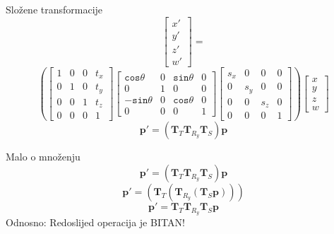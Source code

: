 \documentclass[9pt]{beamer}
\begin{document}
\begin{frame}{Složene transformacije}
	\[ \left[ \begin{array}{c}
	x' \\ y' \\ z'\\ w'
	\end{array}   \right]   = \]  
	\[ \left( \left[ \begin{array}{cccc}
	1 & 0 & 0 & t_{x} \\
	0 & 1 & 0 & t_{y} \\
	0 & 0 & 1 & t_{z} \\
	0 & 0 & 0 & 1 
	\end{array} \right] 
	\left[ \begin{array}{cccc}
	\mathtt{cos}\theta & 0 & \mathtt{sin}\theta & 0 \\
	0 & 1 & 0 & 0 \\
	-\mathtt{sin}\theta & 0 & \mathtt{cos}\theta & 0 \\
	0 & 0 & 0 & 1 
	\end{array} \right] 
	\left[ \begin{array}{cccc}
	s_{x} & 0 & 0 & 0 \\
	0 & s_{y} & 0 & 0 \\
	0 & 0 & s_{z} & 0 \\
	0 & 0 & 0 & 1 
	\end{array} \right] \right)
	\left[ \begin{array}{c}
	x \\ y \\ z\\ w
	\end{array}   \right] \]
	\[ \mathbf{p}' = \left(\mathbf{T}_T \mathbf{T}_{R_{y}} \mathbf{T}_{S} \right)\mathbf{p} \]
\end{frame}

\begin{frame}
	Malo o množenju\\
	\[ \mathbf{p}' = \left(\mathbf{T}_T \mathbf{T}_{R_{y}} \mathbf{T}_{S} \right)\mathbf{p} \]
	\[ \mathbf{p}' = \left( \mathbf{T}_T \left( \mathbf{T}_{R_{y}} 
	\left( \mathbf{T}_{S} \mathbf{p} \right) \right) \right) \]
	\alert{ \[ \mathbf{p}' = \mathbf{T}_T \mathbf{T}_{R_{y}} \mathbf{T}_{S}\mathbf{p} \] }
	Odnosno: \Large{Redoslijed operacija je BITAN!}
\end{frame}
\end{document}
